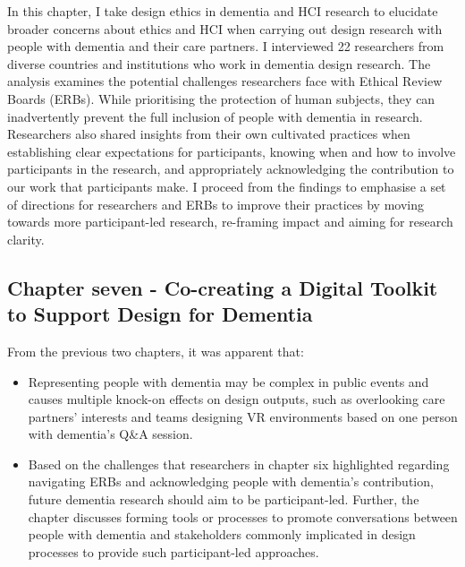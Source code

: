 In this chapter, I take design ethics in dementia and HCI research to elucidate broader concerns about ethics and HCI when carrying out design research with people with dementia and their care partners. I interviewed 22 researchers from diverse countries and institutions who work in dementia design research. The analysis examines the potential challenges researchers face with Ethical Review Boards (ERBs). While prioritising the protection of human subjects, they can inadvertently prevent the full inclusion of people with dementia in research. Researchers also shared insights from their own cultivated practices when establishing clear expectations for participants, knowing when and how to involve participants in the research, and appropriately acknowledging the contribution to our work that participants make. I proceed from the findings to emphasise a set of directions for researchers and ERBs to improve their practices by moving towards more participant-led research, re-framing impact and aiming for research clarity.

\subsection{Chapter seven - Co-creating a Digital Toolkit to Support Design for Dementia}
\label{Intro:ChapterSeven}
From the previous two chapters, it was apparent that: 
\begin{itemize}
\item Representing people with dementia may be complex in public events and causes multiple knock-on effects on design outputs, such as overlooking care partners' interests and teams designing VR environments based on one person with dementia's Q\&A session.

\item Based on the challenges that researchers in chapter six highlighted regarding navigating ERBs and acknowledging people with dementia's contribution, future dementia research should aim to be participant-led. Further, the chapter discusses forming tools or processes to promote conversations between people with dementia and stakeholders commonly implicated in design processes to provide such participant-led approaches.
\end{itemize}

